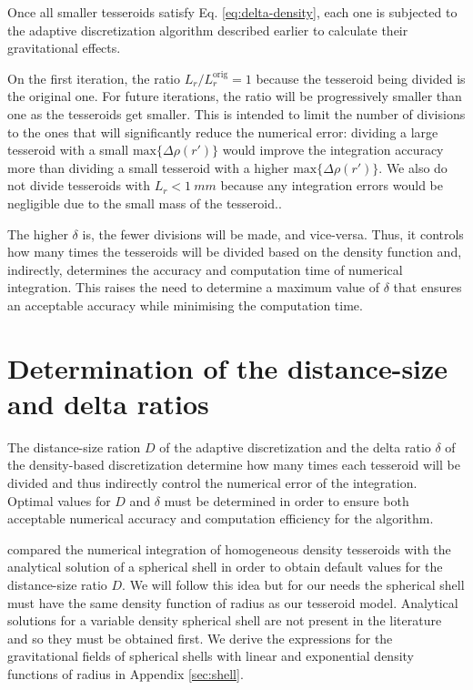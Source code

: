 \documentclass[extra]{gji}
\begin{document}
Once all smaller tesseroids satisfy Eq. \ref{eq:delta-density},
each one is subjected to the adaptive
discretization algorithm described earlier to calculate their gravitational effects.

On the first iteration, the ratio $L_r/L_r^\text{orig} = 1$ because the tesseroid being
divided is the original one.
For future iterations, the ratio will be progressively smaller than one as the
tesseroids get smaller.
This is intended to limit the number of divisions to the ones that will
significantly reduce the numerical error:
dividing a large tesseroid with a small $\text{max}\{ \Delta \rho(r') \}$ would
improve the integration accuracy more than dividing a small tesseroid with a
higher $\text{max}\{ \Delta \rho(r') \}$.
We also do not divide tesseroids with $L_r < 1\ mm$ because any integration errors would
be negligible due to the small mass of the tesseroid..

The higher $\delta$ is, the fewer divisions will be made, and vice-versa.
Thus, it controls how many times the tesseroids will be divided based on the density
function and, indirectly, determines the accuracy and computation time of
numerical integration.
This raises the need to determine a maximum value of $\delta$ that
ensures an acceptable accuracy while minimising the computation time.



\section{Determination of the distance-size and delta ratios}

The distance-size ration $D$ of the adaptive discretization and the delta ratio $\delta$
of the density-based discretization determine how many times each tesseroid will be
divided and thus indirectly control the numerical error of the integration.
Optimal values for $D$ and $\delta$ must be determined in order to ensure both
acceptable numerical accuracy and computation efficiency for the algorithm.

\citet{Uieda2016} compared the numerical integration of homogeneous density tesseroids
with the analytical solution of a spherical shell \citep{Mikuska2006,Grombein2013} in
order to obtain default values for the distance-size ratio $D$.
We will follow this idea but for our needs the spherical shell must
have the same density function of radius as our tesseroid model.
Analytical solutions for a variable density spherical shell are not present in the
literature and so they must be obtained first.
We derive the expressions for the gravitational fields of spherical shells with linear
and exponential density functions of radius in Appendix \ref{sec:shell}.
\end{document}
